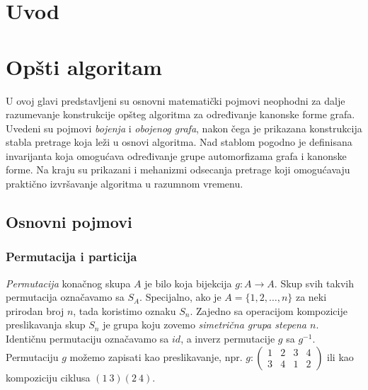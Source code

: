 \documentclass[12pt,oneside]{memoir}
\theoremstyle{definition}
\begin{document}
\frontmatter
\naslovna
\komisija
\apstrakt
\tableofcontents*

\mainmatter

\chapter{Uvod}


\chapter{Opšti algoritam}

 U ovoj glavi predstavljeni su osnovni matematički pojmovi neophodni za dalje
 razumevanje konstrukcije opšteg algoritma za određivanje kanonske forme grafa.
 Uvedeni su pojmovi \emph{bojenja} i \emph{obojenog grafa}, nakon čega je
 prikazana konstrukcija stabla pretrage koja leži u osnovi algoritma. Nad
 stablom pogodno je definisana invarijanta koja omogućava određivanje grupe
 automorfizama grafa i kanonske forme. Na kraju su prikazani i mehanizmi
 odsecanja pretrage koji omogućavaju praktično izvršavanje algoritma u razumnom
 vremenu.

 \section{Osnovni pojmovi}

  \subsection{Permutacija i particija}

   \emph{Permutacija} konačnog skupa $A$ je bilo koja bijekcija $g : A \to A$.
   Skup svih takvih permutacija označavamo sa $S_A$. Specijalno, ako je $A =
   \{1, 2, \dots, n\}$ za neki prirodan broj $n$, tada koristimo oznaku $S_n$.
   Zajedno sa operacijom kompozicije preslikavanja skup $S_n$ je grupa koju
   zovemo \emph{simetrična grupa stepena $n$}. Identičnu permutaciju označavamo
   sa $id$, a inverz permutacije $g$ sa $g^{-1}$. Permutaciju $g$ možemo
   zapisati kao preslikavanje, npr.  $g : \begin{pmatrix} 1 & 2 & 3 & 4\\ 3
   & 4 & 1 & 2 \end{pmatrix}$ ili kao kompoziciju ciklusa $(1\ 3)(2\ 4)$.
\end{document}
